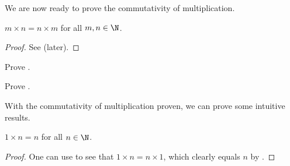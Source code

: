 We are now ready to prove the commutativity of multiplication.

\begin{theorem}\label{theorem:multiplication-commutative-naturals}
    $m \times n = n \times m$ for all $m, n \in \N$.
\end{theorem}
\begin{proof}
    See  (later).
\end{proof}

\begin{exercise}\label{exercise:proof-of-commutativity}
    \begin{partquestions}{\roman*}
        \item Prove .
        \item Prove .
    \end{partquestions}
\end{exercise}

With the commutativity of multiplication proven, we can prove some intuitive results.

\begin{corollary}\label{corollary:multiplication-by-1}
    $1 \times n = n$ for all $n \in \N$.
\end{corollary}
\begin{proof}
    One can use  to see that $1 \times n = n \times 1$, which clearly equals $n$ by .
\end{proof}



